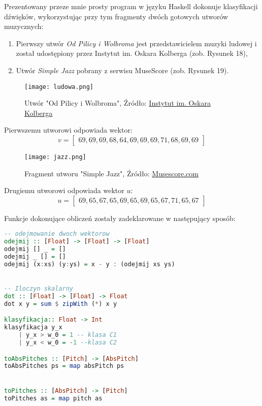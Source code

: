 Prezentowany przeze mnie prosty program w języku Haskell dokonuje klasyfikacji dźwięków, wykorzystując przy tym fragmenty dwóch gotowych utworów muzycznych: 

\begin{enumerate}
    \item Pierwszy utwór \textit{Od Pilicy i Wolbroma} jest przedstawicielem muzyki ludowej i został udostępiony przez Instytut im. Oskara Kolberga (zob. Rysunek 18),
    \item Utwór \textit{Simple Jazz} pobrany z serwisu MuseScore (zob. Rysunek 19).
\end{enumerate}


\begin{figure}[H]
\texttt{[image: ludowa.png]}
\centering
\caption{Utwór "Od Pilicy i Wolbroma", Źródło: \href{http://oskarkolberg.pl/pl-PL/MusicDb/Details/cafbb535-ed69-4b99-9002-f65fe40ed8fe}{Instytut im. Oskara Kolberga}}
\centering
\end{figure}

Pierwszemu utworowi odpowiada wektor:
\begin{equation*}
    v =
    \begin{bmatrix}
    69,69,69,68,64,69,69,69,71,68,69,69
    \end{bmatrix}
\end{equation*}

\begin{figure}[H]
\texttt{[image: jazz.png]}
\centering
\caption{Fragment utworu "Simple Jazz", Źródło: \href{https://musescore.com/user/27009977/scores/5429135}{Musescore.com}}
\centering
\end{figure}
Drugiemu utworowi odpowiada wektor $u$:
\begin{equation*}
u =
    \begin{bmatrix}
    69,65,67,65,69,65,69,65,67,71,65,67
    \end{bmatrix}
\end{equation*}

Funkcje dokonujące obliczeń zostały zadeklarowane w następujący sposób:
\begin{lstlisting}[language = Haskell]
-- odejmowanie dwoch wektorow
odejmij :: [Float] -> [Float] -> [Float]
odejmij [] _ = []
odejmij _ [] = []
odejmij (x:xs) (y:ys) = x - y : (odejmij xs ys)


-- Iloczyn skalarny
dot :: [Float] -> [Float] -> Float
dot x y = sum $ zipWith (*) x y

klasyfikacja:: Float -> Int
klasyfikacja y_x
    | y_x > w_0 = 1 -- klasa C1
    | y_x < w_0 = -1 --klasa C2

toAbsPitches :: [Pitch] -> [AbsPitch]
toAbsPitches ps = map absPitch ps


toPitches :: [AbsPitch] -> [Pitch]
toPitches as = map pitch as
\end{lstlisting}

